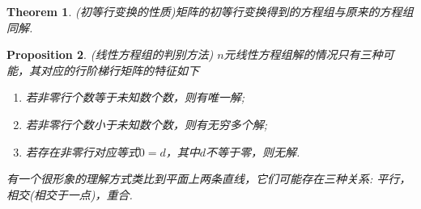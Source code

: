 \documentclass{article}
\newtheorem{theorem}{Theorem}[section]
\newtheorem{proposition}[theorem]{Proposition}
\begin{document}
\begin{theorem}
\rm {\color{red} (初等行变换的性质)}矩阵的初等行变换得到的方程组与原来的方程组同解.
\end{theorem}

\begin{proposition}
\rm {\color{red} (线性方程组的判别方法)} $n$元线性方程组解的情况只有三种可能，其对应的行阶梯行矩阵的特征如下
\begin{enumerate}
	\item 若非零行个数等于未知数个数，则有唯一解;
	\item 若非零行个数小于未知数个数，则有无穷多个解;
	\item 若存在非零行对应等式$0=d$，其中$d$不等于零，则无解.
\end{enumerate}
有一个很形象的理解方式类比{\color{blue}到平面上两条直线，它们可能存在三种关系: 平行，相交(相交于一点)，重合}.
\end{proposition}
\end{document}
